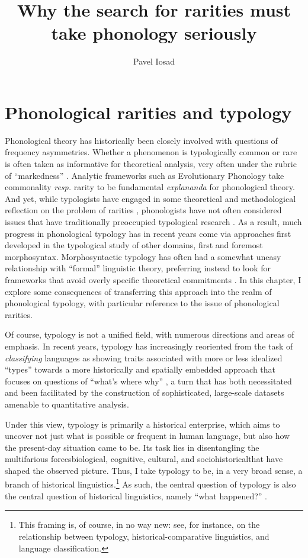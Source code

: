 \documentclass[output=paper,colorlinks,citecolor=brown]{langscibook}
\author{Pavel Iosad\orcid{0000-0002-9200-6682}\affiliation{University of Edinburgh}}
\title{Why the search for rarities must take phonology seriously}
\begin{document}
\maketitle


\section{Phonological rarities and typology}
\label{sec:introduction}

Phonological theory has historically been closely involved with questions of frequency asymmetries. Whether a phenomenon is typologically common or rare is often taken as informative for theoretical analysis, very often under the rubric of \enquote{markedness} \parencite{hume11:_marked}. Analytic frameworks such as Evolutionary Phonology \parencite{blevins} take commonality \emph{resp.} rarity to be fundamental \emph{explananda} for phonological theory. And yet, while typologists have engaged in some theoretical and methodological reflection on the problem of rarities \parencite[cf.][]{cysouw10:_rethin}, phonologists have not often considered issues that have traditionally preoccupied typological research \parencite[cf.][]{plank2018}.
As a result, much progress in phonological typology has in recent years come via approaches first developed in the typological study of other domains, first and foremost morphosyntax. Morphosyntactic typology has often had a somewhat uneasy relationship with \enquote{formal} linguistic theory, preferring instead to look for frameworks that avoid overly specific theoretical commitments \parencite[e.\,g.][]{dryer2008descriptive, haspelmath2010comparative}. In this chapter, I explore some consequences of transferring this approach into the realm of phonological typology, with particular reference to the issue of phonological rarities.

Of course, typology is not a unified field, with numerous directions and areas of emphasis. In recent years, typology has increasingly reoriented from the task of \emph{classifying} languages as showing traits associated with more or less idealized \enquote{types} towards a more historically and spatially embedded approach that focuses on questions of \enquote{what's where why} \parencite{bickel2015distributional}, a turn that has both necessitated and been facilitated by the construction of sophisticated, large-scale datasets amenable to quantitative analysis.

Under this view, typology is primarily a historical enterprise, which aims to uncover not just what is possible or frequent in human language, but also how the present\hyp day situation came to be. Its task lies in disentangling the multifarious forces\dash biological, cognitive, cultural, and sociohistorical\dash that have shaped the observed picture. Thus, I take typology to be, in a very broad sense, a branch of historical linguistics.\footnote{This framing is, of course, in no way new: see, for instance, \textcite{morpurgo1975language, campbell2008language} on the relationship between typology, historical\hyp comparative linguistics, and language classification.} As such, the central question of typology is also the central question of historical linguistics, namely \enquote{what happened?} \parencite{campbell2006areal}.
\end{document}
